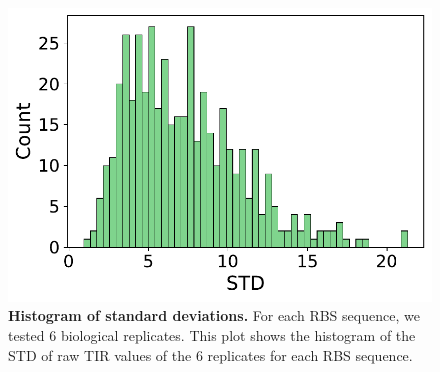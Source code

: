 \documentclass{scrartcl}[2013/05/29]%
\begin{document}
\begin{figure}[!ht]
   \centering
    \includegraphics[scale=0.4]{plots/Supplementary/SDhist.pdf}
   \caption{\textbf{Histogram of standard deviations.}
   For each RBS sequence, we tested 6 biological replicates. This plot shows the histogram of the STD of raw TIR values of the 6 replicates for each RBS sequence. }
   \label{fig: SDhist}
\end{figure}
\end{document}
